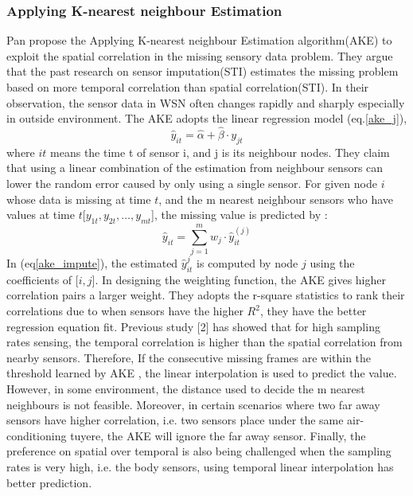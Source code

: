  \subsubsection{Applying K-nearest neighbour Estimation}
Pan\cite{pan:ake} propose the Applying K-nearest neighbour Estimation algorithm(AKE) to exploit the spatial correlation in the missing sensory data problem. They argue that the past research on sensor imputation(STI) estimates the missing problem based on more temporal correlation than spatial correlation(STI). In their observation, the sensor data in WSN often changes rapidly and sharply especially in outside environment. The AKE adopts the linear regression model (eq.\ref{ake_j}),
\begin{equation}
\hat{y}_{it} =\hat{\alpha} +\hat{\beta}\cdot y_{jt}
\label{ake_j}
\end{equation}
 where $it$ means the time t of sensor i,  and j is its neighbour nodes.  
They claim that using a linear combination of the estimation from neighbour sensors can lower the random error caused by only using a single sensor. 
For given node $i$ whose data is missing at time $t$, and the m nearest neighbour sensors who have values at time $t$[$y_{1t}, y_{2t},\dots, y_{mt}$], the missing value is predicted by :   
 \begin{equation}
 \hat{y}_{it} =\sum_{j=1}^m w_j \cdot \hat{y}_{it}^{(j)}
 \label{ake_impute}
 \end{equation}
%
In (eq\ref{ake_impute}), the estimated $\hat{y}_{it}^{j}$ is computed by node $j$ using the coefficients of [$i,j$]. In designing the weighting function, the AKE gives higher correlation pairs a larger weight. They adopts the r-square statistics to rank their correlations due to when sensors have the higher $R^2$, they have the better regression equation fit. 
Previous study [2] has showed that for high sampling rates sensing, the temporal correlation is higher than the spatial correlation from nearby sensors. 
Therefore, If the consecutive missing frames are within the threshold learned by AKE , the linear interpolation is used to predict the value. 
However, in some environment, the distance used to decide the m nearest neighbours is not feasible. 
Moreover, in certain scenarios where two far away sensors have higher correlation, i.e. two sensors place under the same air-conditioning tuyere, the AKE will ignore the far away sensor.
Finally, the preference on spatial over temporal is also being challenged when the sampling rates is very high, i.e. the body sensors, using temporal linear interpolation has better prediction.   
